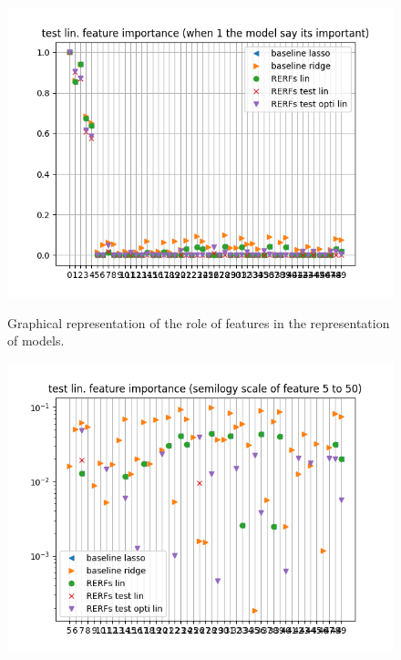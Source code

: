 \documentclass{article}
\begin{document}
\newpage

\begin{figure}

\includegraphics[scale=1]{test_linear_feature_importance.png}

Graphical representation of the role of features in the representation of models.
\end{figure}

\newpage

\begin{figure}

\includegraphics[scale=1]{test_linear_feature_importance2.png}
\end{figure}
\end{document}
